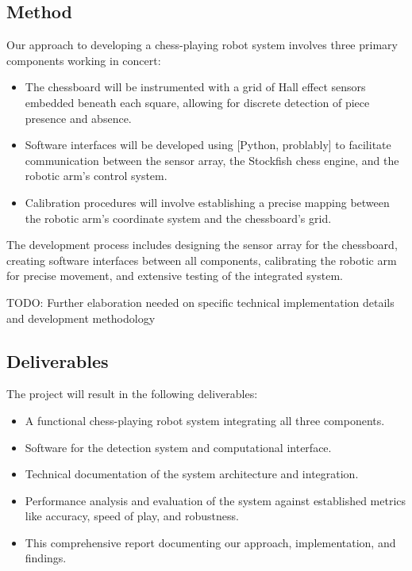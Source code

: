 \subsection{Method}
\label{sec:method}

Our approach to developing a chess-playing robot system involves three primary components working in concert:
\begin{itemize}
  \item The chessboard will be instrumented with a grid of Hall effect sensors embedded beneath each square, allowing for discrete detection of piece presence and absence.
  \item Software interfaces will be developed using [Python, problably] to facilitate communication between the sensor array, the Stockfish chess engine, and the robotic arm's control system.
  \item Calibration procedures will involve establishing a precise mapping between the robotic arm's coordinate system and the chessboard's grid.
\end{itemize}

The development process includes designing the sensor array for the chessboard, creating software interfaces between all components, calibrating the robotic arm for precise movement, and extensive testing of the integrated system.

TODO:  Further elaboration needed on specific technical implementation details and development methodology

\subsection{Deliverables}
\label{sec:deliverables}

The project will result in the following deliverables:
\begin{itemize}
  \item A functional chess-playing robot system integrating all three components.
  \item Software for the detection system and computational interface.
  \item Technical documentation of the system architecture and integration.
  \item Performance analysis and evaluation of the system against established metrics like accuracy, speed of play, and robustness.
  \item This comprehensive report documenting our approach, implementation, and findings.
\end{itemize}

